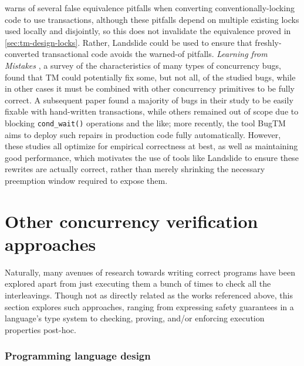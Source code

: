 warns of several false equivalence pitfalls when converting conventionally-locking code to use transactions,
although these pitfalls depend on multiple existing locks used locally and disjointly,
so this does not invalidate the equivalence proved in \cref{sec:tm-design-locks}.
Rather, Landslide could be used to ensure that freshly-converted transactional code avoids the warned-of pitfalls.
{\em Learning from Mistakes} \cite{learning-from-mistakes},
a survey of the characteristics of many types of concurrency bugs,
found that TM could potentially fix some, but not all, of the studied bugs,
while in other cases it must be combined with other concurrency primitives to be fully correct.
A subsequent paper \cite{applying-tm-bugs}
found a majority of bugs in their study to be easily fixable with hand-written transactions,
while others remained out of scope due to blocking {\tt cond\_wait()} operations and the like;
more recently, the tool BugTM \cite{bugtm} aims to deploy such repairs in production code fully automatically.
However, these studies all optimize for empirical correctness at best,
as well as maintaining good performance,
which motivates the use of tools like Landslide to ensure these rewrites
are actually correct,
rather than merely shrinking the necessary preemption window required to expose them.


\section{Other concurrency verification approaches}

Naturally, many avenues of research towards writing correct programs
have been explored
apart from just executing them a bunch of times to check all the interleavings.
Though not as directly related as the works referenced above,
this section explores such approaches,
ranging from expressing safety guarantees in a language's type system
to checking, proving, and/or enforcing execution properties post-hoc.

\subsubsection{Programming language design}

